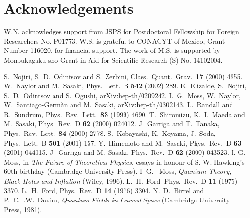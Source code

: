 \documentclass[a4paper,a4paper]{article}
\begin{document}
\section{Acknowledgements}

W.N. acknowledges support from JSPS for Postdoctoral Fellowship for Foreign 
Researchers No. P01773.
W.S. is grateful to CONACYT of Mexico, Grant Number 116020, for financial 
support.
The work of M.S. is supported by Monbukagaku-sho Grant-in-Aid
for Scientific Research (S) No. 14102004.

\begin{thebibliography}{99}

 S.~Nojiri, S.~D.~Odintsov and S.~Zerbini,
Class.\ Quant.\ Grav.\ {\bf 17} (2000) 4855.
 W.~Naylor and M.~Sasaki, Phys.\ Lett.\ B {\bf 542} (2002) 289.
 E.~Elizalde, S.~Nojiri, S.~D.~Odintsov and S.~Ogushi, 
arXiv:hep-th/0209242.
 I.~G.~Moss, W.~Naylor, W.~Santiago-Germ\`{a}n and  M.~Sasaki, 
arXiv:hep-th/0302143.
 L.~Randall and R.~Sundrum,
 Phys.\ Rev.\ Lett.\ {\bf 83} (1999) 4690.
 T.~Shiromizu, K.~I.~Maeda and M.~Sasaki, Phys.\ Rev.\ D
{\bf 62} (2000) 024012.
J.~Garriga and T.~Tanaka,
 Phys.\ Rev.\ Lett.\ {\bf 84} (2000) 2778.
 S.~Kobayashi, K.~Koyama, J.~Soda, Phys.\ Lett.\ B {\bf 501} 
(2001) 157.
 Y.~Himemoto and M.~Sasaki, Phys.\ Rev.\ D {\bf 63} (2001) 044015.
 J.~Garriga and M.~Sasaki, Phys.\ Rev.\ D {\bf 62} (2000) 043523.
 I. G. Moss, in {\it The Future of Theoretical Physics}, essays in 
honour of S. W. Hawking's 60th birthday (Cambridge University Press).
 I. G. ~Moss, {\it Quantum Theory, Black Holes and Inflation} 
(Wiley, 1996).
 L.~H.~Ford, Phys.\ Rev.\ D {\bf 11} (1975) 3370.
 L.~H.~Ford, Phys.\ Rev.\ D {\bf 14} (1976) 3304.
 N.~D.~Birrel and P.~C.~.W.~Davies, {\it Quantum Fields in Curved 
Space} (Cambridge University Press, 1981).

\end{thebibliography}
\end{document}
